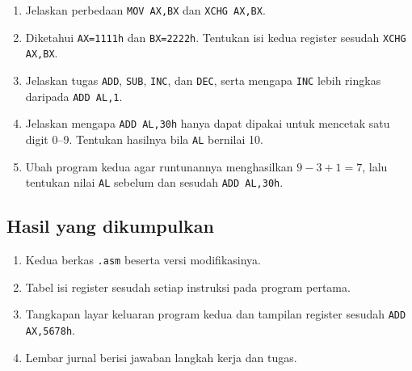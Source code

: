 \begin{enumerate}
    \item Jelaskan perbedaan \texttt{MOV AX,BX} dan
          \texttt{XCHG AX,BX}.
    \item Diketahui \texttt{AX=1111h} dan \texttt{BX=2222h}. Tentukan
          isi kedua register sesudah \texttt{XCHG AX,BX}.
    \item Jelaskan tugas \texttt{ADD}, \texttt{SUB}, \texttt{INC},
          dan \texttt{DEC}, serta mengapa \texttt{INC} lebih ringkas
          daripada \texttt{ADD AL,1}.
    \item Jelaskan mengapa \texttt{ADD AL,30h} hanya dapat dipakai
          untuk mencetak satu digit 0--9. Tentukan hasilnya bila
          \texttt{AL} bernilai 10.
    \item Ubah program kedua agar runtunannya menghasilkan
          $9-3+1=7$, lalu tentukan nilai \texttt{AL} sebelum dan
          sesudah \texttt{ADD AL,30h}.
\end{enumerate}

\subsection{Hasil yang dikumpulkan}

\begin{enumerate}
    \item Kedua berkas \texttt{.asm} beserta versi modifikasinya.
    \item Tabel isi register sesudah setiap instruksi pada program
          pertama.
    \item Tangkapan layar keluaran program kedua dan tampilan
          register sesudah \texttt{ADD AX,5678h}.
    \item Lembar jurnal berisi jawaban langkah kerja dan tugas.
\end{enumerate}
